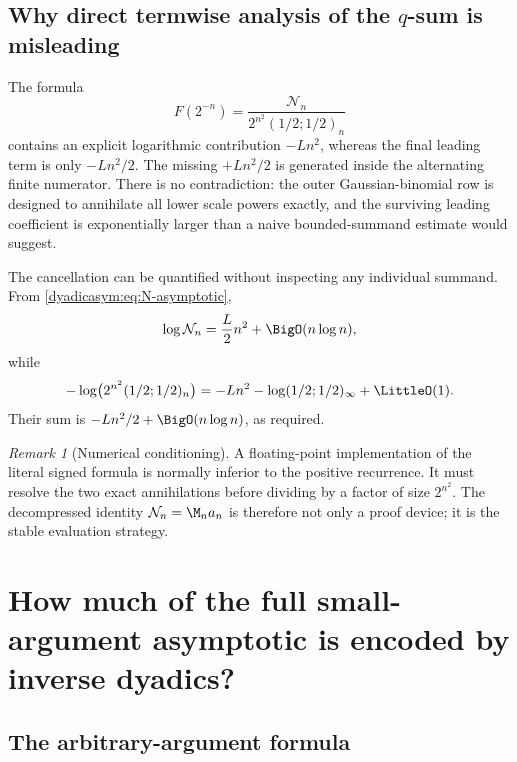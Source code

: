 \documentclass[11pt,oneside]{article}
\theoremstyle{definition}
\theoremstyle{remark}
\newtheorem{remark}[remark]{Remark}
\begin{document}
\subsection{Why direct termwise analysis of the \texorpdfstring{$q$}{q}-sum is misleading}

The formula
\begin{equation*}
 F(2^{-n})=\frac{\mathcal N_n}{2^{n^2}(1/2;1/2)_n}
\end{equation*}
contains an explicit logarithmic contribution $-Ln^2$, whereas the final leading term is only
$-Ln^2/2$.  The missing $+Ln^2/2$ is generated inside the alternating finite numerator.
There is no contradiction: the outer Gaussian-binomial row is designed to annihilate all
lower scale powers exactly, and the surviving leading coefficient is exponentially larger
than a naive bounded-summand estimate would suggest.

The cancellation can be quantified without inspecting any individual summand.  From
\eqref{dyadicasym:eq:N-asymptotic},
\begin{equation}
 \log\mathcal N_n=\frac L2n^2+\BigO(n\log n),               \label{dyadicasym:eq:N-leading}
\end{equation}
while
\begin{equation}
 -\log\bigl(2^{n^2}(1/2;1/2)_n\bigr)
 =-Ln^2-\log(1/2;1/2)_\infty+\LittleO(1).                   \label{dyadicasym:eq:q-den-leading}
\end{equation}
Their sum is $-Ln^2/2+\BigO(n\log n)$, as required.

\begin{remark}[Numerical conditioning]
A floating-point implementation of the literal signed formula is normally inferior to the
positive recurrence.  It must resolve the two exact annihilations before dividing by a factor
of size $2^{n^2}$.  The decompressed identity $\mathcal N_n=\M_na_n$ is therefore not only a
proof device; it is the stable evaluation strategy.
\end{remark}

\section{How much of the full small-argument asymptotic is encoded by inverse dyadics?}
\label{dyadicasym:sec:general-x}

\subsection{The arbitrary-argument formula}
\end{document}
